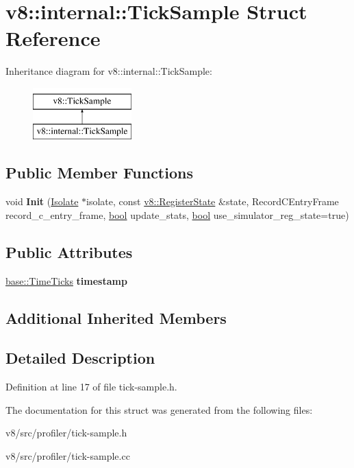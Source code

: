 \hypertarget{structv8_1_1internal_1_1TickSample}{}\section{v8\+:\+:internal\+:\+:Tick\+Sample Struct Reference}
\label{structv8_1_1internal_1_1TickSample}
Inheritance diagram for v8\+:\+:internal\+:\+:Tick\+Sample\+:\begin{figure}[H]
\begin{center}
\leavevmode
\includegraphics[height=2.000000cm]{structv8_1_1internal_1_1TickSample}
\end{center}
\end{figure}
\subsection*{Public Member Functions}
\begin{DoxyCompactItemize}
\item 
\mbox{\label{structv8_1_1internal_1_1TickSample_ad37e11e8aa55b75e814890e4b1f43953}} 
void {\bfseries Init} (\mbox{\hyperlink{classv8_1_1internal_1_1Isolate}{Isolate}} $\ast$isolate, const \mbox{\hyperlink{structv8_1_1RegisterState}{v8\+::\+Register\+State}} \&state, Record\+C\+Entry\+Frame record\+\_\+c\+\_\+entry\+\_\+frame, \mbox{\hyperlink{classbool}{bool}} update\+\_\+stats, \mbox{\hyperlink{classbool}{bool}} use\+\_\+simulator\+\_\+reg\+\_\+state=true)
\end{DoxyCompactItemize}
\subsection*{Public Attributes}
\begin{DoxyCompactItemize}
\item 
\mbox{\label{structv8_1_1internal_1_1TickSample_a5955372cc02222b2db1fff8504ef45e5}} 
\mbox{\hyperlink{classv8_1_1base_1_1TimeTicks}{base\+::\+Time\+Ticks}} {\bfseries timestamp}
\end{DoxyCompactItemize}
\subsection*{Additional Inherited Members}


\subsection{Detailed Description}


Definition at line 17 of file tick-\/sample.\+h.



The documentation for this struct was generated from the following files\+:\begin{DoxyCompactItemize}
\item 
v8/src/profiler/tick-\/sample.\+h\item 
v8/src/profiler/tick-\/sample.\+cc\end{DoxyCompactItemize}
